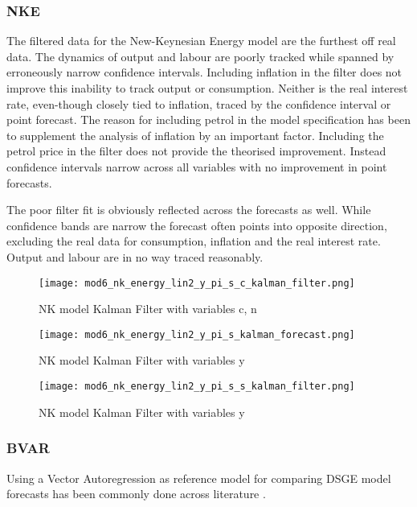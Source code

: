 \documentclass[12pt,a4paper,english]{article} %
\begin{document}
	
	\subsubsection{NKE}
	The filtered data for the New-Keynesian Energy model are the furthest off real data. The dynamics of output and labour are poorly tracked while spanned by erroneously narrow confidence intervals. Including inflation in the filter does not improve this inability to track output or consumption. Neither is the real interest rate, even-though closely tied to inflation, traced by the confidence interval or point forecast.
	The reason for including petrol in the model specification has been to supplement the analysis of inflation by an important factor. Including the petrol price in the filter does not provide the theorised improvement. Instead confidence intervals narrow across all variables with no improvement in point forecasts. 
	
	The poor filter fit is obviously reflected across the forecasts as well. While confidence bands are narrow the forecast often points into opposite direction, excluding the real data for consumption, inflation and the real interest rate. Output and labour are in no way traced reasonably.
	
	\begin{figure}[H]
		\begin{center}
			\texttt{[image: mod6\_nk\_energy\_lin2\_y\_pi\_s\_c\_kalman\_filter.png]}
			\caption{NK model Kalman Filter with variables c, n}\label{fig:nke_fil}
			
			\texttt{[image: mod6\_nk\_energy\_lin2\_y\_pi\_s\_kalman\_forecast.png]}
			\caption{NK model Kalman Filter with variables y}\label{fig:nke_for}
			
			\texttt{[image: mod6\_nk\_energy\_lin2\_y\_pi\_s\_s\_kalman\_filter.png]}
			\caption{NK model Kalman Filter with variables y}\label{fig:nke_fil_s}
		\end{center}
	\end{figure}

	\subsubsection{BVAR}
	Using a Vector Autoregression as reference model for comparing DSGE model forecasts has been commonly done across literature \cite{schorfheide_loss_2000, chin_bayesian_2019}. 
	
\end{document}
